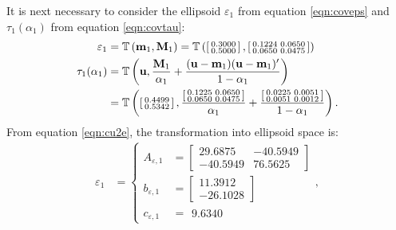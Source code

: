 \begin{example}
It is next necessary to consider the ellipsoid $\varepsilon_1$ from equation
\ref{eqn:coveps} and $\tau_1(\alpha_1)$ from equation \ref{eqn:covtau}:
\begin{align}
    \varepsilon_1 &= \mathbb{T}\left(\mathbf{m}_1,\mathbf{M}_1\right) =
        \mathbb{T}\left(\left[\begin{smallmatrix}0.3000\\0.5000\end{smallmatrix}\right],
            \left[\begin{smallmatrix}0.1224 & 0.0650\\0.0650&0.0475\end{smallmatrix}\right]\right)\\
    \tau_1(\alpha_1) &= \mathbb{T}\left(\mathbf{u},\frac{\mathbf{M}_1}{\alpha_1}+\frac{(\mathbf{u}-\mathbf{m}_1)(\mathbf{u}-\mathbf{m}_1)'}{1-\alpha_1}\right)\\
        &= \mathbb{T}\left(\left[\begin{smallmatrix}0.4499\\0.5342\end{smallmatrix}\right],
        \frac{\left[\begin{smallmatrix}0.1225&0.0650\\0.0650&0.0475\end{smallmatrix}\right]}{\alpha_1}+
        \frac{\left[\begin{smallmatrix}0.0225&0.0051\\0.0051&0.0012\end{smallmatrix}\right]}{1-\alpha_1}\right).
\end{align}
From equation \ref{eqn:cu2e}, the transformation into ellipsoid space is:
\begin{align}
    \varepsilon_1 &= \left\{
        \begin{aligned}
            A_{\varepsilon,1} &= \left[\begin{smallmatrix}29.6875& -40.5949\\ -40.5949& 76.5625\end{smallmatrix}\right]\\
            b_{\varepsilon,1} &= \left[\begin{smallmatrix}11.3912\\-26.1028\end{smallmatrix}\right]\\
            c_{\varepsilon,1} &= \begin{smallmatrix}9.6340\end{smallmatrix}
        \end{aligned}\right.,\\\nonumber

\end{align}
\end{example}
